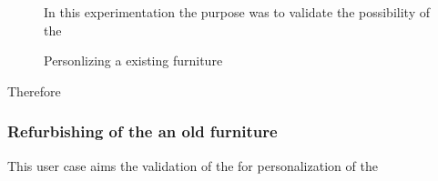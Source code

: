 \documentclass[
  11pt,
]{article}
\begin{document}
\begin{figure}

\begin{minipage}[t]{0.33\linewidth}

{\centering 

In this experimentation the purpose was to validate the possibility of
the

}

\end{minipage}%
%
\begin{minipage}[t]{0.67\linewidth}

{\centering 


\caption{Personlizing a existing furniture}

}

\end{minipage}%

\end{figure}

Therefore

\hypertarget{refurbishing-of-the-an-old-furniture}{%
\subsubsection{Refurbishing of the an old
furniture}\label{refurbishing-of-the-an-old-furniture}}

This user case aims the validation of the for personalization of the
\end{document}
